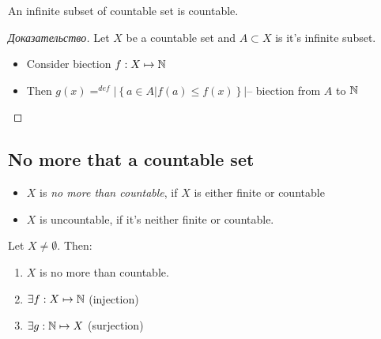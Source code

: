 \begin{theorem}[]
	An infinite subset of countable set is countable.
\end{theorem}

\begin{proof}[Доказательство]
	Let $X$ be a countable set and $A \subset X$ is it's infinite subset.
	\begin{itemize}
		\item Consider biection $f: X \mapsto \mathbb{N}$
		\item Then $g(x) = ^{def} |\left\{ a \in A | f(a) \leq f(x) \right \} |$-- biection from $A$ to $\mathbb{N}$ 
	\end{itemize}
\end{proof}

\subsection{No more that a countable set}

\begin{definition}[]
	\begin{itemize}
		\item $X$ is \textit{no more than countable}, if $X$ is either finite or countable
		\item $X$ is uncountable, if it's neither finite or countable. 
	\end{itemize}
\end{definition}

\begin{theorem}[]
	Let $X \neq  \emptyset$. Then:
	\begin{enumerate}
		\item $X$ is no more than countable.
		\item $\exists f: X \mapsto \mathbb{N}$ (injection)
		\item $\exists g: \mathbb{N} \mapsto X$ (surjection)
	\end{enumerate}
\end{theorem}

